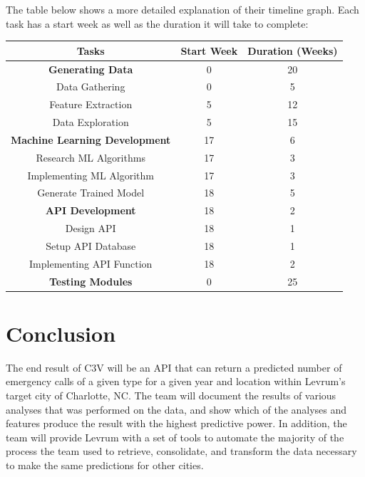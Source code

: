 \documentclass[onecolumn, draftclsnofoot,10pt, compsoc]{IEEEtran}
\begin{document}
\begin{singlespace}
The table below shows a more detailed explanation of their timeline graph. Each task has a start week as well as the duration it will take to complete:
\begin{center}
 \label{tab:title}
    \begin{tabular}{ |c|c|c| }
        \hline
        Tasks & Start Week & Duration (Weeks)\\ 
        \hline
        \textbf{Generating Data} & 0 & 20  \\ 
        \hspace{3mm}Data Gathering & 0 & 5 \\ 
        \hspace{3mm}Feature Extraction & 5 & 12 \\ 
        \hspace{3mm}Data Exploration & 5 & 15 \\
        \hline
        \textbf{Machine Learning Development} & 17 & 6 \\
        \hspace{3mm}Research ML Algorithms & 17 & 3 \\
        \hspace{3mm}Implementing ML Algorithm & 17 & 3 \\ 
        \hspace{3mm}Generate Trained Model & 18 & 5 \\
        \hline
        \textbf{API Development} & 18 & 2 \\
        \hspace{3mm}Design API & 18 & 1 \\
        \hspace{3mm}Setup API Database & 18 & 1 \\ 
        \hspace{3mm}Implementing API Function & 18 & 2 \\
        \hline
        \textbf{Testing Modules} & 0 & 25 \\
        \hline
    \end{tabular}
\end{center}
\section{Conclusion}
\begin{singlespace}
The end result of C3V will be an API that can return a predicted number of emergency calls of a given type for a given year and location within Levrum's target city of Charlotte, NC. 
The team will document the results of various analyses that was performed on the data, and show which of the analyses and features produce the result with the highest predictive power.
In addition, the team will provide Levrum with a set of tools to automate the majority of the process the team used to retrieve, consolidate, and transform the data necessary to make the same predictions for other cities.

\end{singlespace}

\newpage    
{}

\end{singlespace}
\end{document}

